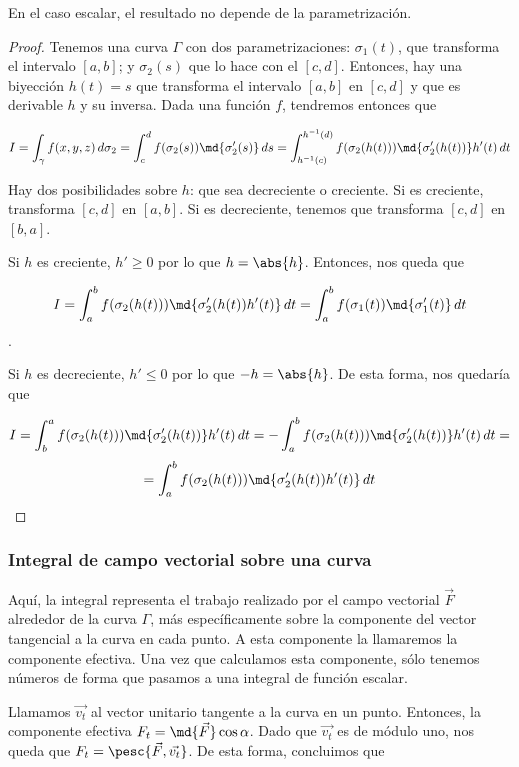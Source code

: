\documentclass[nochap]{apuntes}
\begin{document}
\begin{theorem}
En el caso escalar, el resultado no depende de la parametrización.
\end{theorem}

\begin{proof}
Tenemos una curva $\Gamma$ con dos parametrizaciones: $\sigma_1(t)$, que transforma el intervalo $[a,b]$; y $\sigma_2(s)$ que lo hace con el $[c,d]$. Entonces, hay una biyección $h(t) = s$ que transforma el intervalo $[a,b]$ en $[c,d]$ y que es derivable $h$ y su inversa. Dada una función $f$, tendremos entonces que

\[ I = \int_\gamma f(x,y,z)\,d\sigma_2 = \int_c^df(\sigma_2(s))\md{\sigma_2'(s)}\,ds = \int_{h^{-1}(c)}^{h^{-1}(d)}f(\sigma_2(h(t)))\md{\sigma_2'(h(t))}h'(t)\,dt\]

Hay dos posibilidades sobre $h$: que sea decreciente o creciente. Si es creciente, transforma $[c,d]$ en $[a,b]$. Si es decreciente, tenemos que transforma $[c,d]$ en $[b,a]$.

Si $h$ es creciente, $h' ≥ 0$ por lo que $h = \abs{h}$. Entonces, nos queda que 

\[ I = \int_a^bf(\sigma_2(h(t)))\md{\sigma_2'(h(t))h'(t)}\,dt = \int_a^bf(\sigma_1(t))\md{\sigma_1'(t)}\,dt\].

Si $h$ es decreciente, $h' ≤ 0$ por lo que $-h = \abs{h}$. De esta forma, nos quedaría que

\[ I = \int_b^af(\sigma_2(h(t)))\md{\sigma_2'(h(t))}h'(t)\,dt = -\int_a^bf(\sigma_2(h(t)))\md{\sigma_2'(h(t))} h'(t)\,dt =\]\[= \int_a^bf(\sigma_2(h(t)))\md{\sigma_2'(h(t))h'(t)}\,dt \]
\end{proof}

\subsubsection{Integral de campo vectorial sobre una curva}

Aquí, la integral representa el trabajo realizado por el campo vectorial $\vec{F}$ alrededor de la curva $\Gamma$, más específicamente sobre la componente del vector tangencial a la curva en cada punto. A esta componente la llamaremos la componente efectiva. Una vez que calculamos esta componente, sólo tenemos números de forma que pasamos a una integral de función escalar.

Llamamos $\vec{v_t}$ al vector unitario tangente a la curva en un punto. Entonces, la componente efectiva $F_t = \md{\vec{F}} \cos \alpha$. Dado que $\vec{v_t}$ es de módulo uno, nos queda que $F_t = \pesc{\vec{F}, \vec{v_t}}$. De esta forma, concluimos que 
\end{document}
